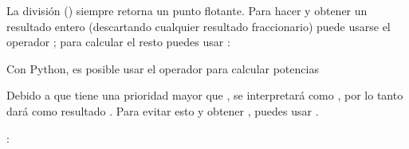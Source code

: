 \documentclass[a4,10pt,spanish]{sphinxmanual}
\begin{document}
\sphinxAtStartPar
La división (\sphinxcode{\sphinxupquote{/}}) siempre retorna un punto flotante. Para hacer {\hyperref[\detokenize{glossary:term-floor-division}]{}} y obtener un resultado entero (descartando cualquier resultado fraccionario) puede usarse el operador \sphinxcode{\sphinxupquote{//}}; para calcular el resto puedes usar \sphinxcode{\sphinxupquote{\%}}:

\begin{sphinxVerbatim}[commandchars=\\\{\}]
    
    
    
      
\end{sphinxVerbatim}

\sphinxAtStartPar
Con Python, es posible usar el operador \sphinxcode{\sphinxupquote{**}} para calcular potencias %
\begin{footnote}[1]\sphinxAtStartFootnote
Debido a que \sphinxcode{\sphinxupquote{**}} tiene una prioridad mayor que ,  se interpretará como , por lo tanto dará como resultado . Para evitar esto y obtener , puedes usar .
%
\end{footnote}:

\begin{sphinxVerbatim}[commandchars=\\\{\}]
    
    
\end{sphinxVerbatim}
\end{document}
